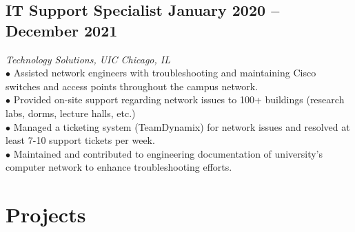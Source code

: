 \documentclass{article}
\begin{document}
\subsection{IT Support Specialist \hfill \textnormal{January 2020 -- December 2021}}
\vspace{-0.5em}
\textit {Technology Solutions, UIC \hfill Chicago, IL}
\\
$\bullet$ Assisted network engineers with troubleshooting and maintaining Cisco switches and access points throughout the campus network.
\\
$\bullet$ Provided on-site support regarding network issues to 100+ buildings (research labs, dorms, lecture halls, etc.)
\\
$\bullet$ Managed a ticketing system (TeamDynamix) for network issues and resolved at least 7-10 support tickets per week.
\\
$\bullet$ Maintained and contributed to engineering documentation of university's computer network to enhance troubleshooting efforts.


\section{Projects}
%
\end{document}

